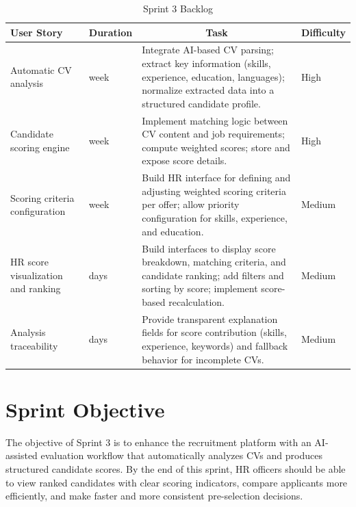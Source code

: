 \setlength{\tabcolsep}{4pt}
\renewcommand{\arraystretch}{1.5}
\begin{table}[H]
\centering
\small
\begin{tabularx}{\textwidth}{|>{\centering\arraybackslash}p{3.2cm}|>{\centering\arraybackslash}p{1.6cm}|X|>{\centering\arraybackslash}p{1.8cm}|}
\hline
\rowcolor{headerblue}
\textbf{User Story} & \textbf{Duration} & \multicolumn{1}{c|}{\textbf{Task}} & \textbf{Difficulty} \\
\hline
Automatic CV analysis
	& 1 week
	& Integrate AI-based CV parsing; extract key information (skills, experience, education, languages); normalize extracted data into a structured candidate profile.
	& High \\
\hline
Candidate scoring engine
	& 1 week
	& Implement matching logic between CV content and job requirements; compute weighted scores; store and expose score details.
	& High \\
\hline
Scoring criteria configuration
	& 1 week
	& Build HR interface for defining and adjusting weighted scoring criteria per offer; allow priority configuration for skills, experience, and education.
	& Medium \\
\hline
HR score visualization and ranking
	& 4 days
	& Build interfaces to display score breakdown, matching criteria, and candidate ranking; add filters and sorting by score; implement score-based recalculation.
	& Medium \\
\hline
Analysis traceability
	& 3 days
	& Provide transparent explanation fields for score contribution (skills, experience, keywords) and fallback behavior for incomplete CVs.
	& Medium \\
\hline
\end{tabularx}
\caption{Sprint 3 Backlog}
\label{tab:sprint3backlog}
\end{table}
\normalsize
\setlength{\tabcolsep}{6pt}
\renewcommand{\arraystretch}{1}

\section{Sprint Objective}

The objective of Sprint 3 is to enhance the recruitment platform with an AI-assisted evaluation workflow that automatically analyzes CVs and produces structured candidate scores. By the end of this sprint, HR officers should be able to view ranked candidates with clear scoring indicators, compare applicants more efficiently, and make faster and more consistent pre-selection decisions.

